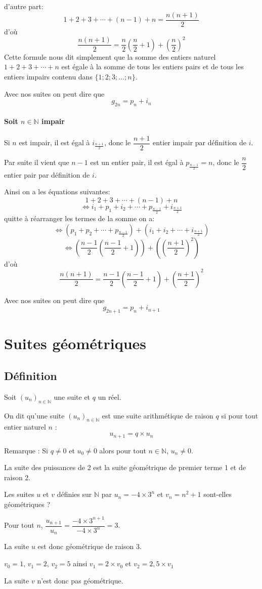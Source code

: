 \documentclass[french]{book}
\newcommand{\N}{\mathbb {N}}
\newcommand{\suite}[1][u]{\left( #1_{n} \right)_{n\in\N}}
\begin{document}
d'autre part: 
$$1+2+3+\cdots+(n-1)+n=\dfrac{n(n+1)}{2}$$
d'où 
$$\dfrac{n(n+1)}{2} =\dfrac{n}{2}(\dfrac{n}{2}+1) +  (\dfrac{n}{2})^2 $$
Cette formule nous dit simplement que la somme des entiers naturel $1+2+3+\cdots+n$ est égale à la somme de tous les entiers pairs et de tous les entiers impairs contenu dans $\{1;2;3;...;n\}$.


Avec nos suites on peut dire que $$g_{2n}=p_{n}+i_{n}$$

\paragraph*{Soit $n \in \N$ impair}

Si $n$ est impair, il est égal à $i_{\frac{n+1}{2}}$, donc le  $\dfrac{n+1}{2}$ entier impair par définition de $i$.
\par Par suite il vient que $n-1$ est un entier pair, il est égal à $p_{\frac{n-1}{2}}=n$, donc le  $\dfrac{n}{2}$ entier pair par définition de $i$.

Ainsi on a les équations suivantes:
$$1+2+3+\cdots+(n-1)+n$$
$$\Longleftrightarrow i_1+ p_1+ i_2 + \cdots + p_{\frac{n-1}{2}} + i_{\frac{n+1}{2}}$$
quitte à réarranger les termes de la somme on a:
$$\Longleftrightarrow (p_1+p_2+\cdots+p_{\frac{n-1}{2}}) + (i_1+ i_2 + \cdots + i_{\frac{n+1}{2}})$$
$$\Longleftrightarrow (\dfrac{n-1}{2}(\dfrac{n-1}{2}+1))+ ( (\dfrac{n+1}{2})^2)$$
d'où 
$$\dfrac{n(n+1)}{2} =\dfrac{n-1}{2}(\dfrac{n-1}{2}+1) +  (\dfrac{n+1}{2})^2 $$

Avec nos suites on peut dire que $$g_{2n+1}=p_{n}+i_{n+1}$$
\newpage

\section{Suites géométriques}
\subsection{Définition}
\begin{defn}
Soit $\suite[u]$ une suite et $q$ un réel.
\par On dit qu'une suite $\suite[u]$ est une suite arithmétique de raison $q$ si pour tout entier naturel $n$ : \[u_{n+1}=q\times u_n\]
\end{defn}

Remarque : Si $q\neq0$ et $u_{0}\neq0$ alors pour tout $n\in\N$, $u_{n}\neq0$.

\begin{exemple}
\par La suite des puissances de 2 est la suite géométrique de premier terme 1 et de raison 2.
\par Les suites $u$ et $v$ définies sur $\N$ par $u_n=-4\times 3^{n}$ et $v_n=n^2+1$ sont-elles géométriques ?


Pour tout $n$, $\dfrac{u_{n+1}}{u_n}=\dfrac{-4\times 3^{n+1}}{-4\times 3^{n}}=3$.
\par La suite $u$ est donc géométrique de raison 3.
\par $v_0=1$, $v_1=2$, $v_2=5$ ainsi $v_1=2\times v_0$ et $v_2=2,5\times v_1$
\par La suite $v$ n'est donc pas géométrique.
\end{exemple}
\end{document}
